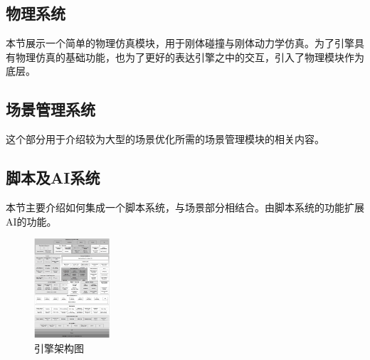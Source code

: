 \subsection{物理系统}

本节展示一个简单的物理仿真模块，用于刚体碰撞与刚体动力学仿真。为了引擎具有物理仿真的基础功能，也为了更好的表达引擎之中的交互，引入了物理模块作为底层。

\maketitle
\subsection{场景管理系统}

这个部分用于介绍较为大型的场景优化所需的场景管理模块的相关内容。

\maketitle
\subsection{脚本及AI系统}

本节主要介绍如何集成一个脚本系统，与场景部分相结合。由脚本系统的功能扩展AI的功能。

\begin{figure}[H]
\centering
\includegraphics[center, width=0.25\textwidth]{chapter-front/pic/fig-runtime-arch.jpeg}
\caption{引擎架构图 \protect\footnotemark}
\end{figure}


